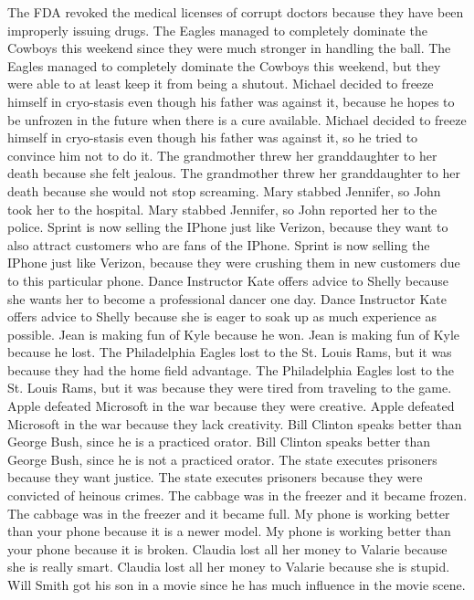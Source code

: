 \documentclass{article}
\begin{document}
\begin{enumerate}
	The FDA revoked the medical licenses of corrupt doctors because they have been improperly issuing drugs.
	The Eagles managed to completely dominate the Cowboys this weekend since they were much stronger in handling the ball.
	The Eagles managed to completely dominate the Cowboys this weekend, but they were able to at least keep it from being a shutout.
	Michael decided to freeze himself in cryo-stasis even though his father was against it, because he hopes to be unfrozen in the future when there is a cure available.
	Michael decided to freeze himself in cryo-stasis even though his father was against it, so he tried to convince him not to do it.
	The grandmother threw her granddaughter to her death because she felt jealous.
	The grandmother threw her granddaughter to her death because she would not stop screaming.
	Mary stabbed Jennifer, so John took her to the hospital.
	Mary stabbed Jennifer, so John reported her to the police.
	Sprint is now selling the IPhone just like Verizon, because they want to also attract customers who are fans of the IPhone.
	Sprint is now selling the IPhone just like Verizon, because they were crushing them in new customers due to this particular phone.
	Dance Instructor Kate offers advice to Shelly because she wants her to become a professional dancer one day.
	Dance Instructor Kate offers advice to Shelly because she is eager to soak up as much experience as possible.
	Jean is making fun of Kyle because he won.
	Jean is making fun of Kyle because he lost.
	The Philadelphia Eagles lost to the St. Louis Rams, but it was because they had the home field advantage.
	The Philadelphia Eagles lost to the St. Louis Rams, but it was because they were tired from traveling to the game.
	Apple defeated Microsoft in the war because they were creative.
	Apple defeated Microsoft in the war because they lack creativity.
	Bill Clinton speaks better than George Bush, since he is a practiced orator.
	Bill Clinton speaks better than George Bush, since he is not a practiced orator.
	The state executes prisoners because they want justice.
	The state executes prisoners because they were convicted of heinous crimes.
	The cabbage was in the freezer and it became frozen.
	The cabbage was in the freezer and it became full.
	My phone is working better than your phone because it is a newer model.
	My phone is working better than your phone because it is broken.
	Claudia lost all her money to Valarie because she is really smart.
	Claudia lost all her money to Valarie because she is stupid.
	Will Smith got his son in a movie since he has much influence in the movie scene.

\end{enumerate}
\end{document}
